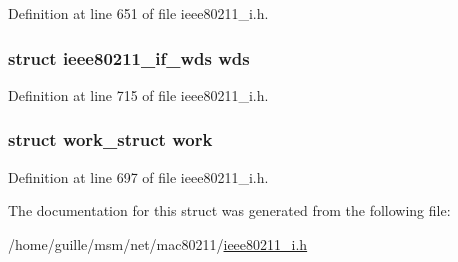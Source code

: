 Definition at line 651 of file ieee80211\-\_\-i.\-h.

\hypertarget{structieee80211__sub__if__data_a09671aeb534ab76414be89358eb296cd}{
\subsubsection[{wds}]{\setlength{\rightskip}{0pt plus 5cm}struct {\bf ieee80211\-\_\-if\-\_\-wds} wds}}\label{structieee80211__sub__if__data_a09671aeb534ab76414be89358eb296cd}


Definition at line 715 of file ieee80211\-\_\-i.\-h.

\hypertarget{structieee80211__sub__if__data_a623997e11b94d7c467ce26627cc488a2}{
\subsubsection[{work}]{\setlength{\rightskip}{0pt plus 5cm}struct work\-\_\-struct work}}\label{structieee80211__sub__if__data_a623997e11b94d7c467ce26627cc488a2}


Definition at line 697 of file ieee80211\-\_\-i.\-h.



The documentation for this struct was generated from the following file\-:\begin{DoxyCompactItemize}
\item 
/home/guille/msm/net/mac80211/\hyperlink{ieee80211__i_8h}{ieee80211\-\_\-i.\-h}\end{DoxyCompactItemize}
